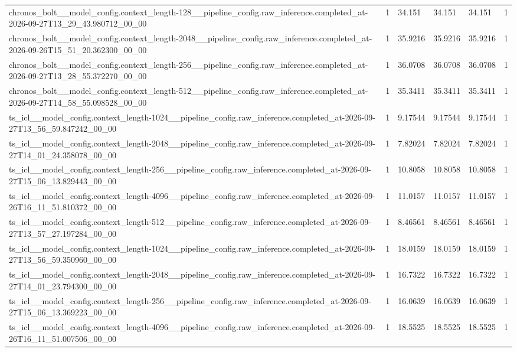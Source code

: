 \begin{tabular}{llllll}
chronos\_bolt\_\_model\_config.context\_length-128\_\_pipeline\_config.raw\_inference.completed\_at-2026-09-27T13\_29\_43.980712\_00\_00 & 1 & 34.151 & 34.151 & 34.151 & 1 \\
chronos\_bolt\_\_model\_config.context\_length-2048\_\_pipeline\_config.raw\_inference.completed\_at-2026-09-26T15\_51\_20.362300\_00\_00 & 1 & 35.9216 & 35.9216 & 35.9216 & 1 \\
chronos\_bolt\_\_model\_config.context\_length-256\_\_pipeline\_config.raw\_inference.completed\_at-2026-09-27T13\_28\_55.372270\_00\_00 & 1 & 36.0708 & 36.0708 & 36.0708 & 1 \\
chronos\_bolt\_\_model\_config.context\_length-512\_\_pipeline\_config.raw\_inference.completed\_at-2026-09-27T14\_58\_55.098528\_00\_00 & 1 & 35.3411 & 35.3411 & 35.3411 & 1 \\
ts\_icl\_\_model\_config.context\_length-1024\_\_pipeline\_config.raw\_inference.completed\_at-2026-09-27T13\_56\_59.847242\_00\_00 & 1 & 9.17544 & 9.17544 & 9.17544 & 1 \\
ts\_icl\_\_model\_config.context\_length-2048\_\_pipeline\_config.raw\_inference.completed\_at-2026-09-27T14\_01\_24.358078\_00\_00 & 1 & 7.82024 & 7.82024 & 7.82024 & 1 \\
ts\_icl\_\_model\_config.context\_length-256\_\_pipeline\_config.raw\_inference.completed\_at-2026-09-27T15\_06\_13.829443\_00\_00 & 1 & 10.8058 & 10.8058 & 10.8058 & 1 \\
ts\_icl\_\_model\_config.context\_length-4096\_\_pipeline\_config.raw\_inference.completed\_at-2026-09-26T16\_11\_51.810372\_00\_00 & 1 & 11.0157 & 11.0157 & 11.0157 & 1 \\
ts\_icl\_\_model\_config.context\_length-512\_\_pipeline\_config.raw\_inference.completed\_at-2026-09-27T13\_57\_27.197284\_00\_00 & 1 & 8.46561 & 8.46561 & 8.46561 & 1 \\
ts\_icl\_\_model\_config.context\_length-1024\_\_pipeline\_config.raw\_inference.completed\_at-2026-09-27T13\_56\_59.350960\_00\_00 & 1 & 18.0159 & 18.0159 & 18.0159 & 1 \\
ts\_icl\_\_model\_config.context\_length-2048\_\_pipeline\_config.raw\_inference.completed\_at-2026-09-27T14\_01\_23.794300\_00\_00 & 1 & 16.7322 & 16.7322 & 16.7322 & 1 \\
ts\_icl\_\_model\_config.context\_length-256\_\_pipeline\_config.raw\_inference.completed\_at-2026-09-27T15\_06\_13.369223\_00\_00 & 1 & 16.0639 & 16.0639 & 16.0639 & 1 \\
ts\_icl\_\_model\_config.context\_length-4096\_\_pipeline\_config.raw\_inference.completed\_at-2026-09-26T16\_11\_51.007506\_00\_00 & 1 & 18.5525 & 18.5525 & 18.5525 & 1 \\

\end{tabular}
